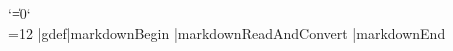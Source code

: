 \def\markdownRendererUlBeginTightPrototype{}%
\def\markdownRendererUlItemPrototype{}%
\def\markdownRendererUlItemEndPrototype{}%
\def\markdownRendererUlEndPrototype{}%
\def\markdownRendererUlEndTightPrototype{}%
\def\markdownRendererOlBeginPrototype{}%
\def\markdownRendererOlBeginTightPrototype{}%
\def\markdownRendererOlItemPrototype{}%
\def\markdownRendererOlItemWithNumberPrototype#1{}%
\def\markdownRendererOlItemEndPrototype{}%
\def\markdownRendererOlEndPrototype{}%
\def\markdownRendererOlEndTightPrototype{}%
\def\markdownRendererDlBeginPrototype{}%
\def\markdownRendererDlBeginTightPrototype{}%
\def\markdownRendererDlItemPrototype#1{}%
\def\markdownRendererDlItemEndPrototype{}%
\def\markdownRendererDlDefinitionBeginPrototype{}%
\def\markdownRendererDlDefinitionEndPrototype{}%
\def\markdownRendererDlEndPrototype{}%
\def\markdownRendererDlEndTightPrototype{}%
\def\markdownRendererEmphasisPrototype#1{}%
\def\markdownRendererStrongEmphasisPrototype#1{}%
\def\markdownRendererBlockQuoteBeginPrototype{}%
\def\markdownRendererBlockQuoteEndPrototype{}%
\def\markdownRendererInputVerbatimPrototype#1{}%
\def\markdownRendererInputFencedCodePrototype#1#2{}%
\def\markdownRendererJekyllDataBooleanPrototype#1#2{}%
\def\markdownRendererJekyllDataEmptyPrototype#1{}%
\def\markdownRendererJekyllDataNumberPrototype#1#2{}%
\def\markdownRendererJekyllDataStringPrototype#1#2{}%
\def\markdownRendererJekyllDataBeginPrototype{}%
\def\markdownRendererJekyllDataEndPrototype{}%
\def\markdownRendererJekyllDataSequenceBeginPrototype#1#2{}%
\def\markdownRendererJekyllDataSequenceEndPrototype{}%
\def\markdownRendererJekyllDataMappingBeginPrototype#1#2{}%
\def\markdownRendererJekyllDataMappingEndPrototype{}%
\def\markdownRendererHeadingOnePrototype#1{}%
\def\markdownRendererHeadingTwoPrototype#1{}%
\def\markdownRendererHeadingThreePrototype#1{}%
\def\markdownRendererHeadingFourPrototype#1{}%
\def\markdownRendererHeadingFivePrototype#1{}%
\def\markdownRendererHeadingSixPrototype#1{}%
\def\markdownRendererHorizontalRulePrototype{}%
\def\markdownRendererFootnotePrototype#1{}%
\def\markdownRendererCitePrototype#1{}%
\def\markdownRendererTextCitePrototype#1{}%
\def\markdownRendererTablePrototype#1#2#3{}%
\def\markdownRendererInlineHtmlCommentPrototype#1{}%
\def\markdownRendererTickedBoxPrototype{}%
\def\markdownRendererHalfTickedBoxPrototype{}%
\def\markdownRendererUntickedBoxPrototype{}%
\let\markdownMakeOther\relax
\let\markdownReadAndConvert\relax
\begingroup
  \catcode`\|=0\catcode`\\=12%
  |gdef|markdownBegin{%
    |markdownReadAndConvert{\markdownEnd}%
                           {|markdownEnd}}%
